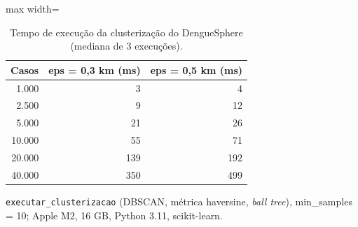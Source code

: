 \begin{table}[htbp]
\centering
\small
\caption{Tempo de execução da clusterização do DengueSphere (mediana de 3 execuções).}
\label{tab:desempenho}
\begin{adjustbox}{max width=\linewidth}
\begin{tabular}{rrr}
\toprule
Casos & eps = 0,3 km (ms) & eps = 0,5 km (ms) \\
\midrule
1.000 & 3 & 4 \\
2.500 & 9 & 12 \\
5.000 & 21 & 26 \\
10.000 & 55 & 71 \\
20.000 & 139 & 192 \\
40.000 & 350 & 499 \\
\bottomrule
\end{tabular}
\end{adjustbox}
\par\smallskip\begin{minipage}{0.95\linewidth}\footnotesize \texttt{executar\_clusterizacao} (DBSCAN, métrica haversine, \textit{ball tree}), min\_samples = 10; Apple M2, 16 GB, Python 3.11, scikit-learn.\end{minipage}
\end{table}
